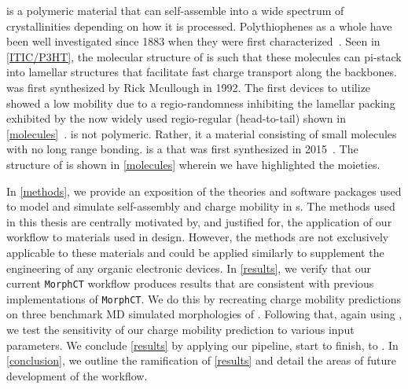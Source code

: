  is a polymeric material that can self-assemble into a wide spectrum of
crystallinities depending on how it is processed.
Polythiophenes as a whole have been well investigated 
since 1883 when they were first characterized~\cite{Poelking2014}.
Seen in \autoref{ITIC/P3HT}, the molecular structure of 
is such that these molecules can pi-stack into lamellar structures that facilitate fast charge transport along
the backbones.  was first synthesized by Rick Mcullough in 1992. The first devices to utilize  showed
a low mobility due to a regio-randomness inhibiting the lamellar packing exhibited by the now widely used
regio-regular (head-to-tail)  shown in \autoref{molecules}~\cite{Zaumseil2014}. 
 is not polymeric. Rather, it a material consisting of small molecules with no long range bonding.
 is a  that was first synthesized in 2015~\cite{Bai2015}. The structure of  is shown in
\autoref{molecules} wherein we have highlighted the moieties.  

In \autoref{methods}, we
provide an exposition of the theories and software packages used to model and simulate self-assembly and
charge mobility in
s.
The methods used in this thesis are centrally motivated by, and justified for, 
the application of our workflow to materials
used in  design. However, the methods are
not exclusively applicable to these materials and could be applied similarly to supplement the engineering of any organic
electronic devices. 
In \autoref{results}, we verify that our current \texttt{MorphCT} workflow produces results that are consistent with previous implementations of \texttt{MorphCT}. We do this by recreating charge mobility predictions on three benchmark MD simulated morphologies of . 
Following that, again using , we test the sensitivity of our charge mobility prediction to various input parameters. We conclude \autoref{results} by applying our pipeline,
start to finish, to . 
In \autoref{conclusion}, we outline the ramification of \autoref{results} and detail the areas of future development of the workflow. 


